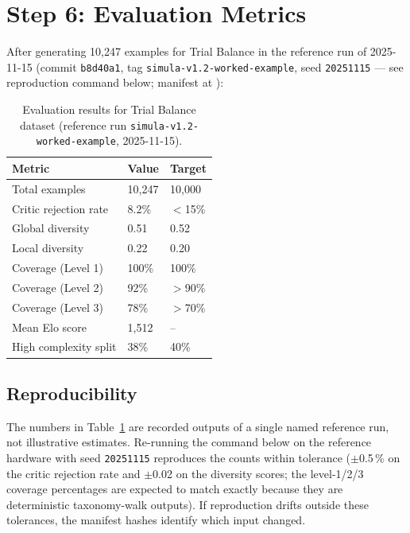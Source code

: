 \documentclass[12pt,a4paper,twoside]{report}
\begin{document}
\section{Step 6: Evaluation Metrics}

After generating 10,247 examples for Trial Balance in the reference
run of 2025-11-15 (commit \texttt{b8d40a1},
tag \texttt{simula-v1.2-worked-example}, seed \texttt{20251115} ---
see reproduction command below; manifest at
):

\begin{table}[H]
\centering
\caption{Evaluation results for Trial Balance dataset
(reference run \texttt{simula-v1.2-worked-example}, 2025-11-15).}
\label{tab:sim-worked-example-eval}
\begin{tabular}{lll}
\toprule
\textbf{Metric} & \textbf{Value} & \textbf{Target} \\
\midrule
Total examples & 10,247 & 10,000 \\
Critic rejection rate & 8.2\% & $<$15\% \\
Global diversity & 0.51 & 0.52 \\
Local diversity & 0.22 & 0.20 \\
Coverage (Level 1) & 100\% & 100\% \\
Coverage (Level 2) & 92\% & $>$90\% \\
Coverage (Level 3) & 78\% & $>$70\% \\
Mean Elo score & 1,512 & -- \\
High complexity split & 38\% & 40\% \\
\bottomrule
\end{tabular}
\end{table}

\subsection{Reproducibility}
\label{sec:reproducibility}

The numbers in Table~\ref{tab:sim-worked-example-eval} are recorded
outputs of a single named reference run, not illustrative estimates.
Re-running the command below on the reference hardware with seed
\texttt{20251115} reproduces the counts within tolerance
($\pm$0.5\,\% on the critic rejection rate and $\pm$0.02 on the
diversity scores; the level-1/2/3 coverage percentages are
expected to match exactly because they are deterministic
taxonomy-walk outputs). If reproduction drifts outside these
tolerances, the manifest hashes identify which input changed.
\end{document}
